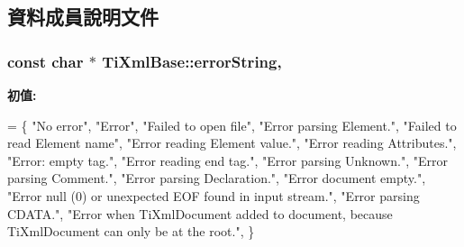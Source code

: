 \subsection{資料成員說明文件}
\subsubsection[{\texorpdfstring{error\+String}{errorString}}]{\setlength{\rightskip}{0pt plus 5cm}const char $\ast$ Ti\+Xml\+Base\+::error\+String\hspace{0.3cm}{\ttfamily [static]}, {\ttfamily [protected]}}\hypertarget{class_ti_xml_base_a7ac8feec4100e446b3d78e1ac0659700}{}\label{class_ti_xml_base_a7ac8feec4100e446b3d78e1ac0659700}
{\bfseries 初值\+:}
\begin{DoxyCode}
=
\{
    \textcolor{stringliteral}{"No error"},
    \textcolor{stringliteral}{"Error"},
    \textcolor{stringliteral}{"Failed to open file"},
    \textcolor{stringliteral}{"Error parsing Element."},
    \textcolor{stringliteral}{"Failed to read Element name"},
    \textcolor{stringliteral}{"Error reading Element value."},
    \textcolor{stringliteral}{"Error reading Attributes."},
    \textcolor{stringliteral}{"Error: empty tag."},
    \textcolor{stringliteral}{"Error reading end tag."},
    \textcolor{stringliteral}{"Error parsing Unknown."},
    \textcolor{stringliteral}{"Error parsing Comment."},
    \textcolor{stringliteral}{"Error parsing Declaration."},
    \textcolor{stringliteral}{"Error document empty."},
    \textcolor{stringliteral}{"Error null (0) or unexpected EOF found in input stream."},
    \textcolor{stringliteral}{"Error parsing CDATA."},
    \textcolor{stringliteral}{"Error when TiXmlDocument added to document, because TiXmlDocument can only be at the root."},
\}
\end{DoxyCode}

